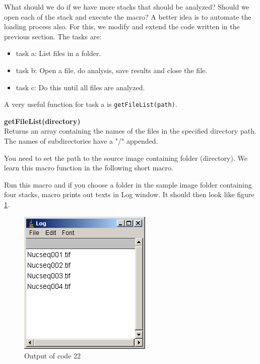 \documentclass[11pt,a4paper,oneside]{report}
\newenvironment{indentCom}%
{\begin{list}{}%
         {\setlength{\leftmargin}{1em}}%
         \item[]%
}
{\end{list}}
\newcommand{\ilcom}[1]{\texttt{\small#1}}
\begin{document}
What should we do if we have more stacks that should be analyzed? Should we open each of the stack and execute the macro? A better idea is to automate the loading process also. For this, we modify and extend the code written in the previous section. The tasks are:

\begin{itemize}
\item task a: List files in a folder.
\item task b: Open a file, do analysis, save results and close the file. 
\item task c: Do this until all files are analyzed.
\end{itemize}
 
A very useful function for task a is \ilcom{getFileList(path)}.
\begin{indentCom}
\textbf{getFileList(directory)}\\
Returns an array containing the names of the files in the specified directory path. The names of subdirectories have a "/" appended.
\end{indentCom}
 
You need to set the path to the source image containing folder (directory). We learn this macro function in the following short macro. 



Run this macro and if you choose a folder in the sample image folder containing four stacks,  macro prints out texts in Log window. It should then look like figure \ref{fig:code22out}.
\begin{figure}[htbp]
\begin{center}
\includegraphics[scale=0.6]{fig/fig2521_FileBatchOUtput.png}
\caption{Output of code 22}
\label{fig:code22out}
\end{center}
\end{figure}
\end{document}
